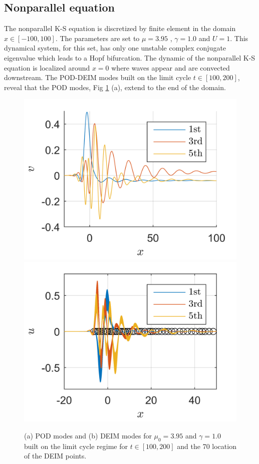 \documentclass[11pt]{article}
\begin{document}
\subsection{Nonparallel equation}
\label{subsec:nonparallel}
The nonparallel K-S equation is discretized by finite element in the domain $x \in [-100,100]$. The parameters are set to $\mu = 3.95$ , $\gamma=1.0$ and $U=1$. This dynamical system, for this set, has only one unstable complex conjugate eigenvalue which leads to a Hopf bifurcation. The dynamic of the nonparallel K-S equation is localized around $x=0$ where waves appear and are convected downstream. The POD-DEIM modes built on the limit cycle $t\in[100,200]$, reveal that the POD modes, Fig \ref{fig:PODmodenonparallel} (a), extend to the end of the domain. 
\begin{figure}
    \centering
    \includegraphics{PODModenon}
    \hfill
    \includegraphics{DEIMModenon}
    \caption{%
    	    (a) POD modes and (b) DEIM modes for  $\mu_0 = 3.95$ and $\gamma = 1.0$ built on the limit cycle regime for $t\in [100, 200]$ and the 70 location of the DEIM points.
        }
    \label{fig:PODmodenonparallel}
\end{figure}
\end{document}
